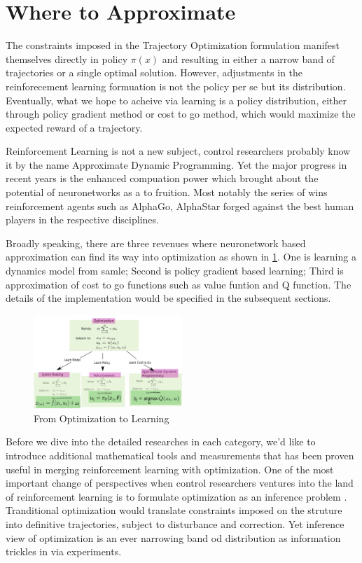 \documentclass[journal]{IEEEtran}
\begin{document}
\section{Where to Approximate}
The constraints imposed in the Trajectory Optimization formulation manifest themselves directly in policy $\pi(x)$ and resulting in either a narrow band of trajectories or a single optimal solution. However, adjustments in the reinforecement learning formuation is not the policy per se but its distribution. Eventually, what we hope to acheive via learning is a policy distribution, either through policy gradient method or cost to go method, which would maximize the expected reward of a trajectory.

Reinforcement Learning is not a new subject, control researchers probably know it by the name Approximate Dynamic Programming. Yet the major progress in recent years is the enhanced compuation power which brought about the potential of neuronetworks as a to fruition. Most notably the series of wins reinforcement agents such as AlphaGo, AlphaStar forged against the best human players in the respective disciplines.

Broadly speaking, there are three revenues where neuronetwork based approximation can find its way into optimization as shown in \ref{fig:1}. One is learning a dynamics model from samle; Second is policy gradient based learning; Third is approximation of cost to go functions such as value funtion and Q function. The details of the implementation would be specified in the subsequent sections.

\begin{figure}[H]
    \centering
    \includegraphics[width=0.5\textwidth]{Control.png}
    \caption{From Optimization to Learning}
    \label{fig:1}
\end{figure}

Before we dive into the detailed researches in each category, we'd like to introduce additional mathematical tools and measurements that has been proven useful in merging reinforcement learning with optimization. One of the most important change of perspectives when control researchers ventures into the land of reinforcement learning is to formulate optimization as an inference problem \cite{Levine2018ReinforcementLA}. Tranditional optimization would translate constraints imposed on the struture into definitive trajectories, subject to disturbance and correction. Yet inference view of optimization is an ever narrowing band od distribution as information trickles in via experiments.
\end{document}
